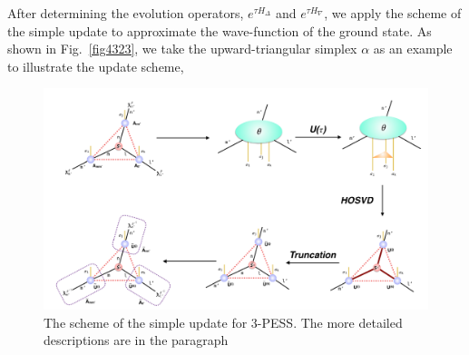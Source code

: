 After determining the evolution operators, $e^{\tau H_{\Delta}}$ and $e^{\tau H_{\nabla}}$, we apply the scheme of the simple update to approximate the wave-function of the ground state. As shown in Fig.~\ref{fig4323}, we take the upward-triangular simplex $\alpha$ as an example to illustrate the update scheme,

\begin{figure}[ht]
	\centering
	\includegraphics[width=1.00\textwidth]{figures/fig4322.png}
	\caption[The scheme of the simple update for 3-PESS.]{The scheme of the simple update for 3-PESS. The more detailed descriptions are in the paragraph}
	\label{fig4322}
\end{figure}

